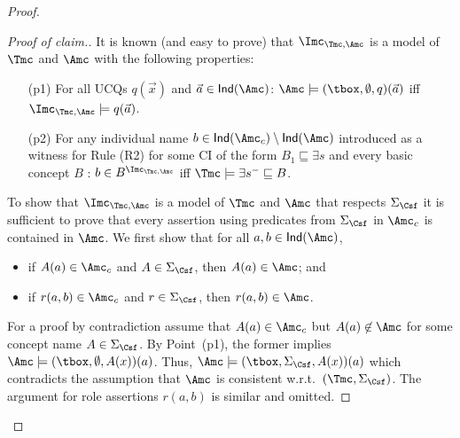 \documentclass{lmcs}
\theoremstyle{definition}
\let\OriginalQedSymbol\qedsymbol
\renewcommand{\qedsymbol}{\OriginalQedSymbol\setcounter{claim}{0}}
\let\NormalQedSymbol\qedsymbol
\newenvironment{clmproof}[1]{\renewcommand{\qedsymbol}{$\dashv$}\begin{proof}[Proof of claim.]\space#1}{\end{proof}\renewcommand{\qedsymbol}{\NormalQedSymbol}}
\begin{document}
\begin{proof}
\begin{clmproof}
It is known \cite{DBLP:conf/kr/KontchakovLTWZ10} (and easy to prove) that $\Imc_{\Tmc,\Amc}$ is a model of $\Tmc$ and 
$\Amc$ with the following properties:
  \begin{itemize}
 \item[(p1)] For all UCQs $q(\vec{x})$ and $\vec{a}\in {\sf Ind}(\Amc)$: $\Amc\models (\tbox,\emptyset,q)(\vec{a})$ iff $\Imc_{\Tmc,\Amc}\models q(\vec{a})$.
%
 \item[(p2)] For any individual name $b\in {\sf
      Ind}(\Amc_{c})\setminus {\sf Ind}(\Amc)$ introduced as a witness
    for Rule (R2) for some CI of the form $B_{1}\sqsubseteq \exists s$ and every basic concept $B$
    : $b\in B^{\Imc_{\Tmc,\Amc}}$ iff $\Tmc\models \exists s^{-} \sqsubseteq B$.
  \end{itemize}
%
  To show that $\Imc_{\Tmc,\Amc}$ is a model of $\Tmc$ and $\Amc$ that respects
  $\Sigma_\Csf$ it is sufficient to prove that every assertion using
  predicates from $\Sigma_\Csf$ in $\Amc_{c}$ is contained in $\Amc$. We first show that for all $a,b\in {\sf Ind}(\Amc)$,
    \begin{itemize}
    \item if $A(a)\in \Amc_{c}$ and $A\in\Sigma_\Csf$, then
      $A(a)\in \Amc$; and
    \item if $r(a,b)\in \Amc_{c}$ and $r\in \Sigma_\Csf$,
      then $r(a,b)\in \Amc$.
    \end{itemize}
    For a proof by contradiction assume that $A(a)\in \Amc_{c}$ but 
    $A(a)\not\in \Amc$ for some concept name $A\in\Sigma_\Csf$. 
    By Point~(p1), the former implies 
    $\Amc\models(\tbox,\emptyset,A(x))(a)$. Thus, $\Amc\models 
    (\tbox,\Sigma_\Csf, A(x))(a)$ which contradicts the assumption that 
    $\Amc$ is consistent w.r.t.~$(\Tmc,\Sigma_\Csf)$. The argument 
    for role assertions $r(a,b)$ is similar and omitted.


\end{clmproof}
\end{proof}
\end{document}
